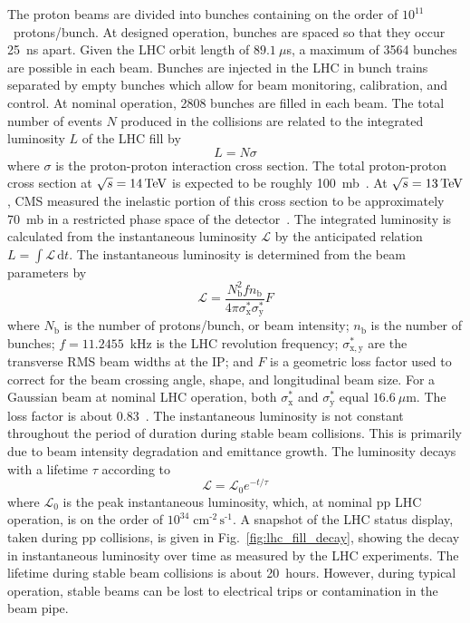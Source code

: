 The proton beams are divided into bunches containing on the order of $10^{11}$~protons/bunch. At designed operation, bunches are spaced so that they occur 25~ns apart. Given the LHC orbit length of $89.1~\mu$s, a maximum of 3564 bunches are possible in each beam. Bunches are injected in the LHC in bunch trains separated by empty bunches which allow for beam monitoring, calibration, and control. At nominal operation, 2808 bunches are filled in each beam. The total number of events $N$ produced in the collisions are related to the integrated luminosity $L$ of the LHC fill by
\begin{equation}
	L = N\sigma
\end{equation}
where $\sigma$ is the proton-proton interaction cross section. The total proton-proton cross section at $\sqrt{s} = 14\,\text{Te\hspace{-.08em}V}$ is expected to be roughly 100~mb~\cite{Bruning:782076}. At $\sqrt{s} = 13\,\text{Te\hspace{-.08em}V}$, CMS measured the inelastic portion of this cross section to be approximately 70~mb in a restricted phase space of the detector~\cite{Sirunyan:2018nqx}. The integrated luminosity is calculated from the instantaneous luminosity $\mathcal{L}$ by the anticipated relation $L = \int \mathcal{L} \, \text{d}t$. The instantaneous luminosity is determined from the beam parameters by
\begin{equation}
	\mathcal{L} = \frac{N_{\mathrm{b}}^2 f n_{\mathrm{b}}}{4\pi\sigma_{\mathrm{x}}^*\sigma_{\mathrm{y}}^*}F
\end{equation}
where $N_{\mathrm{b}}$ is the number of protons/bunch, or beam intensity; $n_{\mathrm{b}}$ is the number of bunches; $f = 11.2455$~kHz is the LHC revolution frequency; $\sigma_{\mathrm{x,y}}^*$ are the transverse RMS beam widths at the IP; and $F$ is a geometric loss factor used to correct for the beam crossing angle, shape, and longitudinal beam size. For a Gaussian beam at nominal LHC operation, both $\sigma_{\mathrm{x}}^*$ and $\sigma_{\mathrm{y}}^*$ equal $16.6~\mu$m. The loss factor is about 0.83~\cite{Bruning:782076}. The instantaneous luminosity is not constant throughout the period of duration during stable beam collisions. This is primarily due to beam intensity degradation and emittance growth. The luminosity decays with a lifetime $\tau$ according to
\begin{equation}
	\mathcal{L} = \mathcal{L}_0e^{-t/\tau}
\end{equation}
where $\mathcal{L}_0$ is the peak instantaneous luminosity, which, at nominal pp LHC operation, is on the order of $10^{34} \;\text{cm}^{\texttt{-}2} \, \text{s}^{\texttt{-}1}$. A snapshot of the LHC status display, taken during pp collisions, is given in Fig.~\ref{fig:lhc_fill_decay}, showing the decay in instantaneous luminosity over time as measured by the LHC experiments. The lifetime during stable beam collisions is about 20~hours. However, during typical operation, stable beams can be lost to electrical trips or contamination in the beam pipe.

